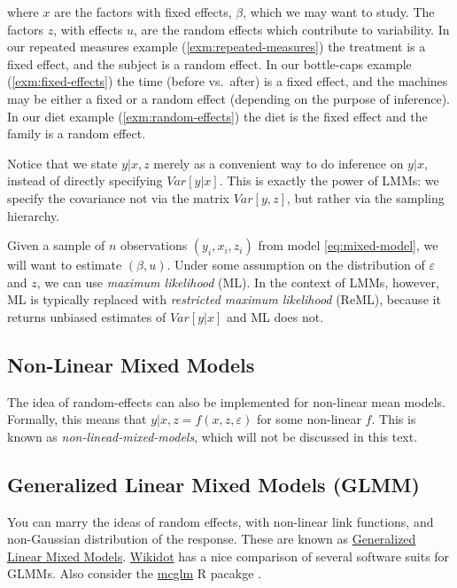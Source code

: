\documentclass[]{book}
\theoremstyle{definition}
\theoremstyle{definition}
\theoremstyle{definition}
\theoremstyle{remark}
\begin{document}
where \(x\) are the factors with fixed effects, \(\beta\), which we may
want to study. The factors \(z\), with effects \(u\), are the random
effects which contribute to variability. In our repeated measures
example (\ref{exm:repeated-measures}) the treatment is a fixed effect,
and the subject is a random effect. In our bottle-caps example
(\ref{exm:fixed-effects}) the time (before vs.~after) is a fixed effect,
and the machines may be either a fixed or a random effect (depending on
the purpose of inference). In our diet example
(\ref{exm:random-effects}) the diet is the fixed effect and the family
is a random effect.

Notice that we state \(y|x,z\) merely as a convenient way to do
inference on \(y|x\), instead of directly specifying \(Var[y|x]\). This
is exactly the power of LMMs: we specify the covariance not via the
matrix \(Var[y,z]\), but rather via the sampling hierarchy.

Given a sample of \(n\) observations \((y_i,x_i,z_i)\) from model
\eqref{eq:mixed-model}, we will want to estimate \((\beta,u)\). Under some
assumption on the distribution of \(\varepsilon\) and \(z\), we can use
\emph{maximum likelihood} (ML). In the context of LMMs, however, ML is
typically replaced with \emph{restricted maximum likelihood} (ReML),
because it returns unbiased estimates of \(Var[y|x]\) and ML does not.

\subsection{Non-Linear Mixed Models}\label{non-linear-mixed-models}

The idea of random-effects can also be implemented for non-linear mean
models. Formally, this means that \(y|x,z=f(x,z,\varepsilon)\) for some
non-linear \(f\). This is known as \emph{non-linead-mixed-models}, which
will not be discussed in this text.

\subsection{Generalized Linear Mixed Models
(GLMM)}\label{generalized-linear-mixed-models-glmm}

You can marry the ideas of random effects, with non-linear link
functions, and non-Gaussian distribution of the response. These are
known as
\href{https://en.wikipedia.org/wiki/Generalized_linear_mixed_model}{Generalized
Linear Mixed Models}.
\href{http://glmm.wikidot.com/pkg-comparison}{Wikidot} has a nice
comparison of several software suits for GLMMs. Also consider the
\href{https://www.jstatsoft.org/article/view/v084i04}{mcglm} R pacakge
\citep{bonat2018multiple}.
\end{document}
